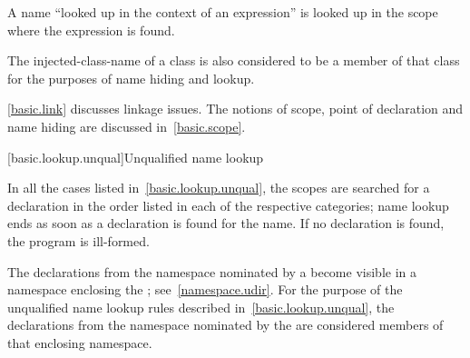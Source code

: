\pnum
A name ``looked up in the context of an expression'' is looked up
in the scope where the expression is found.

\pnum
The injected-class-name of a class is also
considered to be a member of that class for the purposes of name hiding
and lookup.

\pnum
\begin{note}
\ref{basic.link} discusses linkage issues. The notions of
scope, point of declaration and name hiding are discussed
in~\ref{basic.scope}.
\end{note}

[basic.lookup.unqual]{Unqualified name lookup}

\pnum
{}%
%
In all the cases listed in~\ref{basic.lookup.unqual}, the scopes are
searched for a declaration in the order listed in each of the respective
categories; name lookup ends as soon as a declaration is found for the
name. If no declaration is found, the program is ill-formed.

\pnum
The declarations from the namespace nominated by a
 become visible in a namespace enclosing the
; see~\ref{namespace.udir}. For the purpose of
the unqualified name lookup rules described
in~\ref{basic.lookup.unqual}, the declarations from the namespace
nominated by the  are considered members of
that enclosing namespace.

